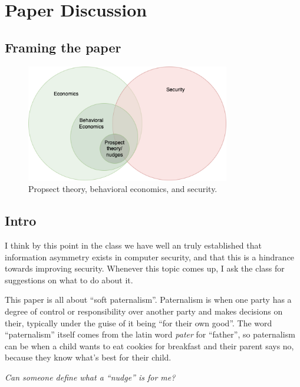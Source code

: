 \documentclass[11pt]{article}
\begin{document}
\section{Paper Discussion}


\subsection{Framing the paper}

\begin{figure}[h]
    \centering
    \includegraphics*[width=3.5in]{venn.png}
    \caption{Propsect theory, behavioral economics, and security.}
    \label{fig:venn}
\end{figure}
\FloatBarrier

\subsection{Intro}

I think by this point in the class we have well an truly established that information asymmetry exists in computer security, and that this is a hindrance towards improving security.
Whenever this topic comes up, I ask the class for suggestions on what to do about it. 

This paper is all about ``soft paternalism''. Paternalism is when one party has a degree of control or responsibility over another party and makes decisions on their, typically under the guise of it being ``for their own good''.
The word ``paternalism'' itself comes from the latin word {\it pater} for ``father'', so paternalism can be when a child wants to eat cookies for breakfast and their parent says no, because they know what's best for their child.




{\it Can someone define what a ``nudge'' is for me?}
\end{document}
